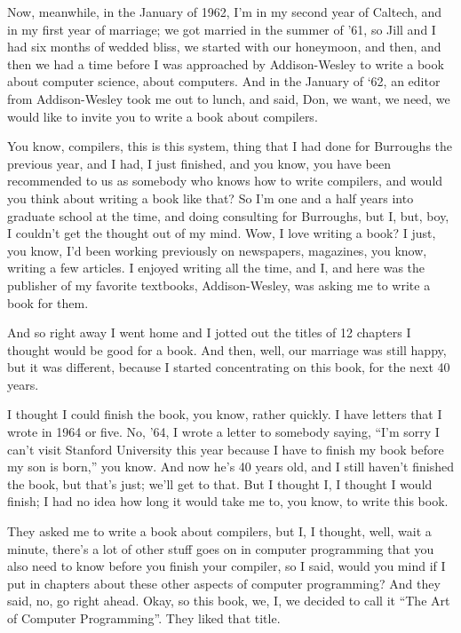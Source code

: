 \documentclass[]{article}
\begin{document}
Now, meanwhile, in the January of 1962, I'm in my second year of
Caltech, and in my first year of marriage; we got married in the summer
of '61, so Jill and I had six months of wedded bliss, we started with
our honeymoon, and then, and then we had a time before I was approached
by Addison-Wesley to write a book about computer science, about
computers. And in the January of `62, an editor from Addison-Wesley took
me out to lunch, and said, Don, we want, we need, we would like to
invite you to write a book about compilers.

You know, compilers, this is this system, thing that I had done for
Burroughs the previous year, and I had, I just finished, and you know,
you have been recommended to us as somebody who knows how to write
compilers, and would you think about writing a book like that? So I'm
one and a half years into graduate school at the time, and doing
consulting for Burroughs, but I, but, boy, I couldn't get the thought
out of my mind. Wow, I love writing a book? I just, you know, I'd been
working previously on newspapers, magazines, you know, writing a few
articles. I enjoyed writing all the time, and I, and here was the
publisher of my favorite textbooks, Addison-Wesley, was asking me to
write a book for them.

And so right away I went home and I jotted out the titles of 12 chapters
I thought would be good for a book. And then, well, our marriage was
still happy, but it was different, because I started concentrating on
this book, for the next 40 years.

I thought I could finish the book, you know, rather quickly. I have
letters that I wrote in 1964 or five. No, '64, I wrote a letter to
somebody saying, ``I'm sorry I can't visit Stanford University this year
because I have to finish my book before my son is born,'' you know. And
now he's 40 years old, and I still haven't finished the book, but that's
just; we'll get to that. But I thought I, I thought I would finish; I
had no idea how long it would take me to, you know, to write this book.

They asked me to write a book about compilers, but I, I thought, well,
wait a minute, there's a lot of other stuff goes on in computer
programming that you also need to know before you finish your compiler,
so I said, would you mind if I put in chapters about these other aspects
of computer programming? And they said, no, go right ahead. Okay, so
this book, we, I, we decided to call it ``The Art of Computer
Programming''. They liked that title.
\end{document}
